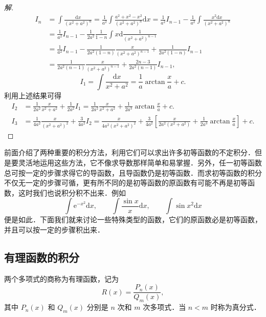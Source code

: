 \begin{proof}[解]
\[
\begin{aligned}
I_{n} &= \int\frac{\mathrm{d}x}{\left(x^{2}+a^{2}\right)^{n}}
= \frac{1}{a^{2}}\int\frac{a^{2}+x^{2}-x^{2}}{\left(x^{2}+a^{2}\right)^{n}}\mathrm{d}x
= \frac{1}{a^{2}}I_{n-1}-\frac{1}{a^{2}}\int\frac{x^{2}\mathrm{d}x}{\left(x^{2}+a^{2}\right)^{n}}\\
&= \frac{1}{a^{2}}I_{n-1}-\frac{1}{2a^{2}}\frac{1}{1-n}\int x\mathrm{d}\frac{1}{\left(x^{2}+a^{2}\right)^{n-1}}\\
&= \frac{1}{a^{2}}I_{n-1}-\frac{1}{2a^{2}(1-n)}\frac{x}{\left(x^{2}+a^{2}\right)^{n-1}}
+\frac{1}{2a^{2}(1-n)}I_{n-1}\\
&= \frac{1}{2a^{2}(n-1)}\frac{x}{\left(x^{2}+a^{2}\right)^{n-1}}
+\frac{2n-3}{2a^{2}(n-1)}I_{n-1},
\end{aligned}
\]
\[
I_{1} = \int\frac{\mathrm{d}x}{x^{2}+a^{2}} = \frac{1}{a}\arctan\frac{x}{a}+c.
\]
利用上述结果可得
\[
\begin{aligned}
I_{2} &= \frac{1}{2a^{2}}\frac{x}{x^{2}+a^{2}}+\frac{1}{2a^{2}}I_{1}
= \frac{1}{2a^{2}}\frac{x}{x^{2}+a^{2}}+\frac{1}{2a^{3}}\arctan\frac{x}{a}+c.\\
I_{3} &= \frac{1}{4a^{2}}\frac{x}{\left(x^{2}+a^{2}\right)^{2}}+\frac{3}{4a^{2}}I_{2}
= \frac{x}{4a^{2}\left(x^{2}+a^{2}\right)^{2}}
+\frac{3}{4a^{2}}\left[\frac{x}{2a^{2}\left(x^{2}+a^{2}\right)}+\frac{1}{2a^{3}}\arctan\frac{x}{a}\right]+c.
\end{aligned}
\]
\end{proof}

前面介绍了两种重要的积分方法，利用它们可以求出许多初等函数的不定积分．但是要灵活地运用这些方法，它不像求导数那样简单和易掌握．另外，任一初等函数总可按一定的步骤求得它的导函数，且导函数仍是初等函数．而求初等函数的积分不仅无一定的步骤可循，更有所不同的是初等函数的原函数有可能不再是初等函数，这时我们也说积分积不出来．例如
\[
\int\mathrm{e}^{-x^{2}}\mathrm{d}x,\qquad \int\frac{\sin x}{x}\mathrm{d}x,\qquad \int\sin x^{2}\mathrm{d}x
\]
便是如此．下面我们就来讨论一些特殊类型的函数，它们的原函数必是初等函数，并且可以按一定的步骤积出来．

\subsection{有理函数的积分}

两个多项式的商称为有理函数，记为
\[
R(x) = \frac{P_{n}(x)}{Q_{m}(x)},
\]
其中 $P_{n}(x)$ 和 $Q_{m}(x)$ 分别是 $n$ 次和 $m$ 次多项式．当 $n < m$ 时称为真分式．


